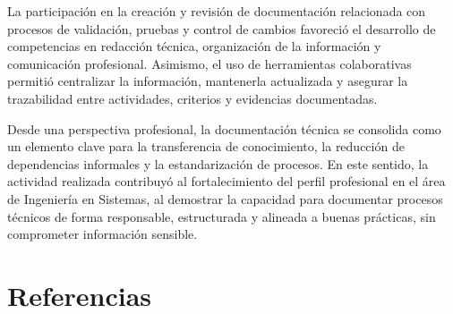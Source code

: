 \documentclass[12pt]{article}
\begin{document}
La participación en la creación y revisión de documentación relacionada con procesos de validación, pruebas y control de cambios favoreció el desarrollo de competencias en redacción técnica, organización de la información y comunicación profesional. Asimismo, el uso de herramientas colaborativas permitió centralizar la información, mantenerla actualizada y asegurar la trazabilidad entre actividades, criterios y evidencias documentadas.

Desde una perspectiva profesional, la documentación técnica se consolida como un elemento clave para la transferencia de conocimiento, la reducción de dependencias informales y la estandarización de procesos. En este sentido, la actividad realizada contribuyó al fortalecimiento del perfil profesional en el área de Ingeniería en Sistemas, al demostrar la capacidad para documentar procesos técnicos de forma responsable, estructurada y alineada a buenas prácticas, sin comprometer información sensible.


\section*{Referencias}
\end{document}
